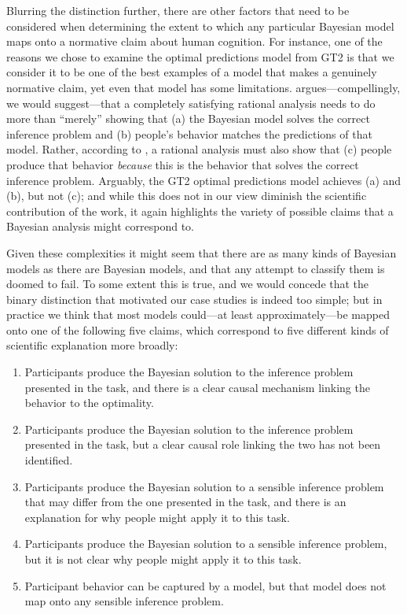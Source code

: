 \documentclass[doc,floatsintext]{apa6}
\begin{document}
Blurring the distinction further, there are other factors that need to be considered when determining the extent to which any particular Bayesian model maps onto a normative claim about human cognition. For instance, one of the reasons we chose to examine the optimal predictions model from GT2 is that we consider it to be one of the best examples of a model that makes a genuinely normative claim, yet even that model has some limitations.  argues---compellingly, we would suggest---that a completely satisfying rational analysis needs to do more than ``merely'' showing that (a) the Bayesian model solves the correct inference problem and (b) people's behavior matches the predictions of that model. Rather, according to , a rational analysis must also show that (c) people produce that behavior {\it because} this is the behavior that solves the correct inference problem. Arguably, the GT2 optimal predictions model achieves (a) and (b), but not (c); and while this does not in our view diminish the scientific contribution of the work, it again highlights the variety of possible claims that a Bayesian analysis might correspond to.

Given these complexities it might seem that there are as many kinds of Bayesian models as there are Bayesian models, and that any attempt to classify them is doomed to fail. To some extent this is true, and we would concede that the binary distinction that motivated our case studies is indeed too simple; but in practice we think that most  models could---at least approximately---be mapped onto one of the following five claims, which correspond to five different kinds of scientific explanation more broadly:

\begin{enumerate}
\item Participants produce the Bayesian solution to the inference problem presented in the task, and there is a clear causal mechanism linking the behavior to the optimality.
\item Participants produce the Bayesian solution to the inference problem presented in the task, but a clear causal role linking the two has not been identified.
\item Participants produce the Bayesian solution to a sensible inference problem that may differ from the one presented in the task, and there is an explanation for why people might apply it to this task.
\item Participants produce the Bayesian solution to a sensible inference problem, but it is not clear why people might apply it to this task.
\item Participant behavior can be captured by a model, but that model does not map onto any sensible inference problem.
\end{enumerate}
\end{document}
